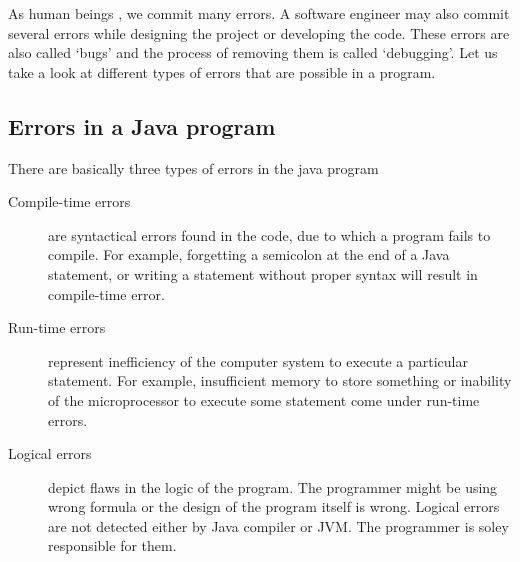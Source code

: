 \documentclass[11pt,a4paper]{article}
\author{TalentSprint}
\date{}
\begin{document}
As human beings , we commit many errors. A software engineer may also commit several errors while designing the project or developing the code. These errors are also called `bugs' and the process of removing them is called `debugging'. Let us take a look at different types of errors that are possible in a program.

\subsection*{Errors in a Java program}
There are basically three types of errors in the java program
\begin{description}
\item[Compile-time errors] are syntactical errors found in the code, due to which a program fails to compile. For example, forgetting a semicolon at the end of a Java statement, or writing a statement without proper syntax will result in compile-time error.
\item[Run-time errors] represent inefficiency of the computer system to execute a particular statement. For example, insufficient memory to store something or inability of the microprocessor to execute some statement come under run-time errors.
\item[Logical errors] depict flaws in the logic of the program. The programmer might be using wrong formula or the design of the program itself is wrong. Logical errors are not detected either by Java compiler or JVM. The programmer is soley responsible for them.
\end{description}
\vfill{\ }
\end{document}
